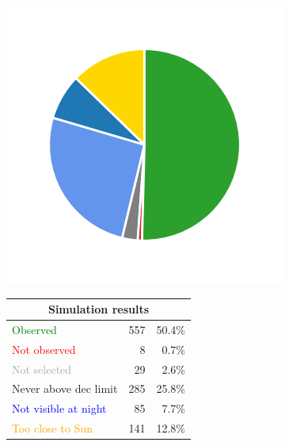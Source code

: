 \begin{colsection}
\begin{colsection}
\begin{figure}[p]
    \begin{center}
        \begin{minipage}[t]{0.15\textwidth}\vspace{0.6cm}
            \includegraphics[trim={.5cm 0 .5cm 0},clip,width=\linewidth]{images/gw_sims/2n8_pie.png}
        \end{minipage}
        \begin{minipage}[t]{0.45\textwidth}\vspace{0pt}
            \begin{tabular}{lrr}
                \multicolumn{3}{c}{\textbf{Simulation results}} \\
                \midrule
                \textcolor{Green}{Observed} & 557 & 50.4\% \\
                \textcolor{Red}{Not observed} & 8 & 0.7\% \\
                \textcolor{darkgray}{Not selected} & 29 & 2.6\% \\
                \textcolor{NavyBlue}{Never above dec limit} & 285 & 25.8\% \\
                \textcolor{Blue}{Not visible at night} & 85 & 7.7\% \\
                \textcolor{Orange}{Too close to Sun} & 141 & 12.8\% \\

\end{tabular}
\end{minipage}
\end{center}
\end{figure}
\end{colsection}
\end{colsection}
